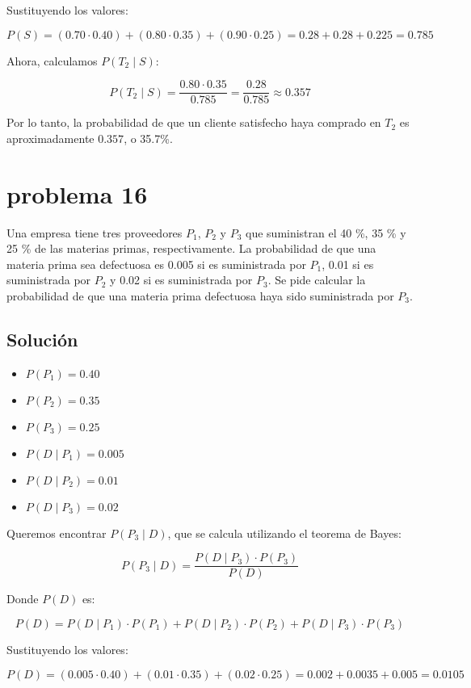 \documentclass[12pt,a4paper]{article}
\begin{document}
Sustituyendo los valores:

\[
P(S) = (0.70 \cdot 0.40) + (0.80 \cdot 0.35) + (0.90 \cdot 0.25) = 0.28 + 0.28 + 0.225 = 0.785
\]

Ahora, calculamos \( P(T_2 \mid S) \):

\[
P(T_2 \mid S) = \frac{0.80 \cdot 0.35}{0.785} = \frac{0.28}{0.785} \approx 0.357
\]

Por lo tanto, la probabilidad de que un cliente satisfecho haya comprado en \( T_2 \) es aproximadamente \( 0.357 \), o 35.7\%.

\newpage 
\section*{problema 16}
Una empresa tiene tres proveedores \( P_1 \), \( P_2 \) y \( P_3 \) que suministran el 40 \%, 35 \% y 25 \% de las materias primas, respectivamente. La probabilidad de que una materia prima sea defectuosa es 0.005 si es suministrada por \( P_1 \), 0.01 si es suministrada por \( P_2 \) y 0.02 si es suministrada por \( P_3 \). Se pide calcular la probabilidad de que una materia prima defectuosa haya sido suministrada por \( P_3 \).

\subsection*{Solución}

\begin{itemize}
    \item \( P(P_1) = 0.40 \)
    \item \( P(P_2) = 0.35 \)
    \item \( P(P_3) = 0.25 \)
    \item \( P(D \mid P_1) = 0.005 \)
    \item \( P(D \mid P_2) = 0.01 \)
    \item \( P(D \mid P_3) = 0.02 \)
\end{itemize}

Queremos encontrar \( P(P_3 \mid D) \), que se calcula utilizando el teorema de Bayes:

\[
P(P_3 \mid D) = \frac{P(D \mid P_3) \cdot P(P_3)}{P(D)}
\]

Donde \( P(D) \) es:

\[
P(D) = P(D \mid P_1) \cdot P(P_1) + P(D \mid P_2) \cdot P(P_2) + P(D \mid P_3) \cdot P(P_3)
\]

Sustituyendo los valores:

\[
P(D) = (0.005 \cdot 0.40) + (0.01 \cdot 0.35) + (0.02 \cdot 0.25) = 0.002 + 0.0035 + 0.005 = 0.0105
\]
\end{document}
